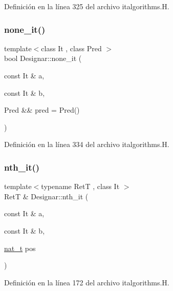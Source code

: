 Definición en la línea 325 del archivo italgorithms.\+H.

\mbox{\label{namespace_designar_a1db95e69891b9a861d56297c556a645b}} 
\subsubsection{\texorpdfstring{none\+\_\+it()}{none\_it()}\hspace{0.1cm}{\footnotesize\ttfamily [2/2]}}
{\footnotesize\ttfamily template$<$class It , class Pred $>$ \\
bool Designar\+::none\+\_\+it (\begin{DoxyParamCaption}\item[{const It \&}]{a,  }\item[{const It \&}]{b,  }\item[{Pred \&\&}]{pred = {\ttfamily Pred()} }\end{DoxyParamCaption})}



Definición en la línea 334 del archivo italgorithms.\+H.

\mbox{\label{namespace_designar_a6009b5708fa05c048e3d11a5893165d1}} 
\subsubsection{\texorpdfstring{nth\+\_\+it()}{nth\_it()}}
{\footnotesize\ttfamily template$<$typename RetT , class It $>$ \\
RetT \& Designar\+::nth\+\_\+it (\begin{DoxyParamCaption}\item[{const It \&}]{a,  }\item[{const It \&}]{b,  }\item[{\hyperlink{namespace_designar_aa72662848b9f4815e7bf31a7cf3e33d1}{nat\+\_\+t}}]{pos }\end{DoxyParamCaption})}



Definición en la línea 172 del archivo italgorithms.\+H.

\mbox{\label{namespace_designar_a72ca73ad8bb829f0ea703a0bfa62414c}} 
